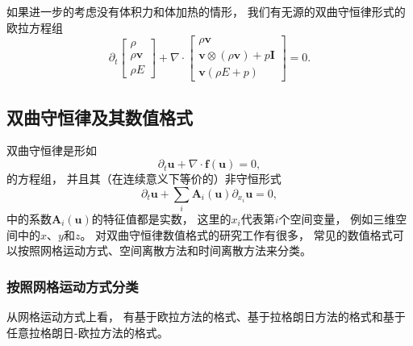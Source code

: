 如果进一步的考虑没有体积力和体加热的情形，
我们有无源的双曲守恒律形式的欧拉方程组
\begin{equation}
  {\partial_t}
  \begin{bmatrix} \rho \\ \rho {\bm v} \\ \rho E \end{bmatrix}
  +\nabla \cdot
  \begin{bmatrix} \rho {
    \bm v} \\ {\bm v} \otimes (\rho {\bm v})+ p \bm I \\ {\bm v}(\rho E+p)\end{bmatrix}
  = 0.
\end{equation}

\subsection{双曲守恒律及其数值格式}

双曲守恒律是形如
\begin{equation}
  \label{eq:balance-law}
  {\partial_t}{\bm u}+\nabla \cdot{\bm f}(\bm u)= 0,
\end{equation}
的方程组，
并且其（在连续意义下等价的）非守恒形式
\begin{equation}
  {\partial_t}{\bm u}+\sum_i{\bm A}_i(\bm u){\partial_{x_i}}\bm u= 0,
\end{equation}
中的系数${\bm A}_i(\bm u)$的特征值都是实数，
这里的$x_i$代表第$i$个空间变量，
例如三维空间中的$x$、$y$和$z$。
对双曲守恒律数值格式的研究工作有很多，
常见的数值格式可以按照网格运动方式、空间离散方法和时间离散方法来分类。

\subsubsection{按照网格运动方式分类}

从网格运动方式上看，
有基于欧拉方法的格式、基于拉格朗日方法的格式和基于任意拉格朗日-欧拉方法的格式。

